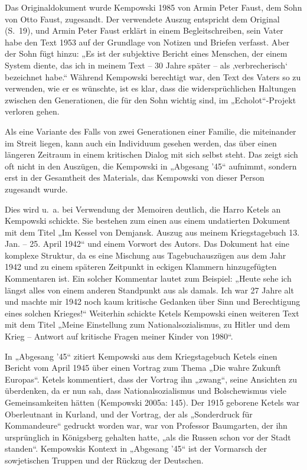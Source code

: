 \begin{multicols*}{2}
Das Originaldokument wurde Kempowski 1985 von Armin Peter Faust, dem Sohn von Otto Faust, zugesandt. Der verwendete Auszug entspricht dem Original (S. 19), und Armin Peter Faust erklärt in einem Begleitschreiben, sein Vater habe den Text 1953 auf der Grundlage von Notizen und Briefen verfasst. Aber der Sohn fügt hinzu: „Es ist der subjektive Bericht eines Menschen, der einem System diente, das ich in meinem Text – 30 Jahre später – als ‚verbrecherisch‘ bezeichnet habe.“ Während Kempowski berechtigt war, den Text des Vaters so zu verwenden, wie er es wünschte, ist es klar, dass die widersprüchlichen Haltungen zwischen den Generationen, die für den Sohn wichtig sind, im „Echolot“-Projekt verloren gehen.

Als eine Variante des Falls von zwei Generationen einer Familie, die miteinander im Streit liegen, kann auch ein Individuum gesehen werden, das über einen längeren Zeitraum in einem kritischen Dialog mit sich selbst steht. Das zeigt sich oft nicht in den Auszügen, die Kempowski in „Abgesang ’45“ aufnimmt, sondern erst in der Gesamtheit des Materials, das Kempowski von dieser Person zugesandt wurde.

Dies wird u. a. bei Verwendung der Memoiren deutlich, die Harro Ketels an Kempowski schickte. Sie bestehen zum einen aus einem undatierten Dokument mit dem Titel „Im Kessel von Demjansk. Auszug aus meinem Kriegstagebuch 13. Jan. – 25. April 1942“ und einem Vorwort des Autors. Das Dokument hat eine komplexe Struktur, da es eine Mischung aus Tagebuchauszügen aus dem Jahr 1942 und zu einem späteren Zeitpunkt in eckigen Klammern hinzugefügten Kommentaren ist. Ein solcher Kommentar lautet zum Beispiel: „Heute sehe ich längst alles von einem anderen Standpunkt aus als damals. Ich war 27 Jahre alt und machte mir 1942 noch kaum kritische Gedanken über Sinn und Berechtigung eines solchen Krieges!“ Weiterhin schickte Ketels Kempowski einen weiteren Text mit dem Titel „Meine Einstellung zum Nationalsozialismus, zu Hitler und dem Krieg – Antwort auf kritische Fragen meiner Kinder von 1980“.

In „Abgesang ’45“ zitiert Kempowski aus dem Kriegstagebuch Ketels einen Bericht vom April 1945 über einen Vortrag zum Thema „Die wahre Zukunft Europas“. Ketels kommentiert, dass der Vortrag ihn „zwang“, seine Ansichten zu überdenken, da er nun sah, dass Nationalsozialismus und Bolschewismus viele Gemeinsamkeiten hätten (Kempowski 2005a: 145). Der 1915 geborene Ketels war Oberleutnant in Kurland, und der Vortrag, der als „Sonderdruck für Kommandeure“ gedruckt worden war, war von Professor Baumgarten, der ihn ursprünglich in Königsberg gehalten hatte, „als die Russen schon vor der Stadt standen“. Kempowskis Kontext in „Abgesang ’45“ ist der Vormarsch der sowjetischen Truppen und der Rückzug der Deutschen.


\end{multicols*}
